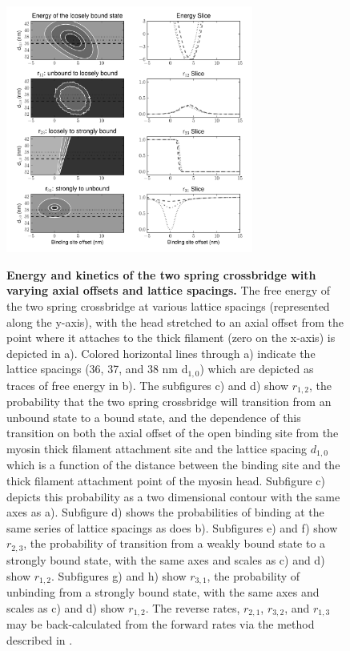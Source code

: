 \documentclass[]{article}
\begin{document}
\begin{figure}[htbp]
    \begin{center}
    \includegraphics[width=3.2in]{../imgs/Figure2.pdf}
    \label{fig:2s}
    \caption{
        \textbf{Energy and kinetics of the two spring crossbridge with varying axial offsets and lattice spacings.} 
        The free energy of the two spring crossbridge at various lattice spacings (represented along the y-axis), with the head stretched to an axial offset from the point where it attaches to the thick filament (zero on the x-axis) is depicted in a). Colored horizontal lines through a) indicate the lattice spacings (36, 37, and 38 nm d$_{1,0}$) which are depicted as traces of free energy in b).
        The subfigures c) and d) show $r_{1,2}$, the probability that the two spring crossbridge will transition from an unbound state to a bound state, and the dependence of this transition on both the axial offset of the open binding site from the myosin thick filament attachment site and the lattice spacing $d_{1,0}$ which is a function of the distance between the binding site and the thick filament attachment point of the myosin head. Subfigure c) depicts this probability as a two dimensional contour with the same axes as a). Subfigure d) shows the probabilities of binding at the same series of lattice spacings as does b).
        Subfigures e) and f) show $r_{2,3}$, the probability of transition from a weakly bound state to a strongly bound state, with the same axes and scales as c) and d) show $r_{1,2}$.
        Subfigures g) and h) show $r_{3,1}$, the probability of unbinding from a strongly bound state, with the same axes and scales as c) and d) show $r_{1,2}$.
        The reverse rates, $r_{2,1}$, $r_{3,2}$, and $r_{1,3}$ may be back-calculated from the forward rates via the method described in \cite{Tanner:2007:pe115}.
    }
    \end{center}
\end{figure}
\end{document}
